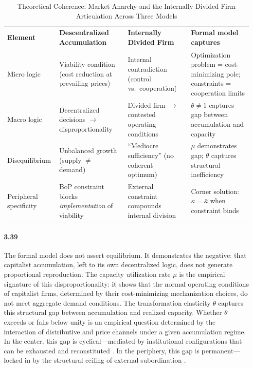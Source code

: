 \begin{table}[H]
	\centering
	\small
	\caption{Theoretical Coherence: Market Anarchy and the Internally Divided Firm Articulation Across Three Models}
	\label{tab:coherence}
	\begin{tabular}{p{2.2cm}p{3.8cm}p{3.8cm}p{4.2cm}}
		\toprule
		\textbf{Element} & \textbf{Descentralized Accumulation} &
		\textbf{Internally Divided Firm} & \textbf{Formal model captures} \\
		\midrule
		\midrule
		Micro logic & Viability condition (cost
		reduction at prevailing prices) & Internal
		contradiction (control vs.\ cooperation) &
		Optimization problem = cost-minimizing pole;
		constraints = cooperation limits \\
		Macro logic & Decentralized decisions $\to$
		disproportionality & Divided firm $\to$
		contested operating conditions & $\theta \neq 1$
		captures gap between accumulation and capacity \\
		Disequilibrium & Unbalanced growth (supply
		$\neq$ demand) & ``Mediocre sufficiency''
		\citep{Vidal2022} (no coherent optimum) & $\mu$
		demonstrates gap; $\theta$ captures structural
		inefficiency \\
		Peripheral specificity & BoP constraint blocks
		\textit{implementation} of viability & External
		constraint compounds internal division & Corner
		solution: $\kappa = \bar{\kappa}$ when
		constraint binds \\
		\bottomrule
	\end{tabular}
\end{table}

\paragraph{3.39}
The formal model does not assert equilibrium. It
demonstrates the negative: that capitalist accumulation,
left to its own decentralized logic, does not generate
proportional reproduction. The capacity utilization rate
$\mu$ is the empirical signature of this
disproportionality: it shows that the normal operating
conditions of capitalist firms, determined by their
cost-minimizing mechanization choices, do not meet
aggregate demand conditions. The transformation elasticity
$\theta$ captures this structural gap between accumulation
and realized capacity. Whether $\theta$ exceeds or falls
below unity is an empirical question determined by the
interaction of distributive and price channels under a
given accumulation regime. In the center, this gap is
cyclical---mediated by institutional configurations that
can be exhausted and reconstituted
\citep{Vidal2015, Vidal2019}. In the periphery, this gap
is permanent---locked in by the structural ceiling of
external subordination \citep{Prebisch1981, Ahumada2019}.

